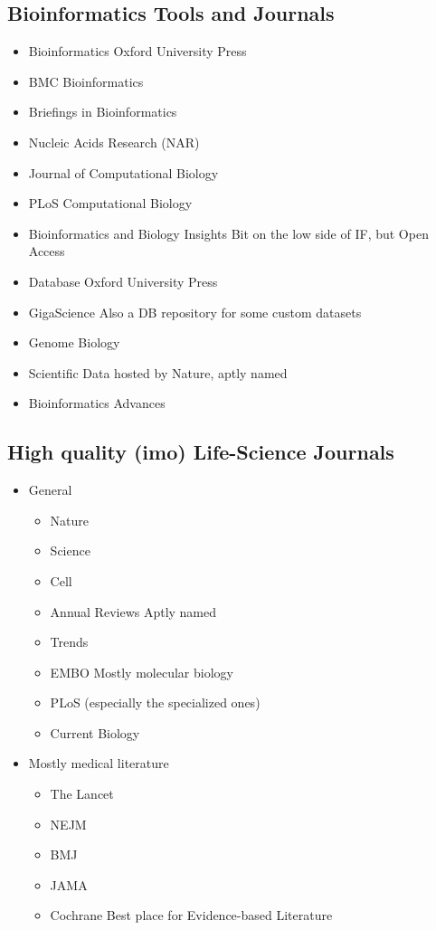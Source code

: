 \documentclass[11pt]{report}
\begin{document}
{\subsection{Bioinformatics Tools and Journals}
\begin{itemize}
	\item Bioinformatics \dotfill Oxford University Press
	\item BMC Bioinformatics
	\item Briefings in Bioinformatics
	\item Nucleic Acids Research (NAR)
	\item Journal of Computational Biology
	\item PLoS Computational Biology
	\item Bioinformatics and Biology Insights \dotfill Bit on the low side of IF, but Open Access
	\item Database \dotfill Oxford University Press
	\item GigaScience \dotfill Also a DB repository for some custom datasets
	\item Genome Biology
	\item Scientific Data \dotfill hosted by Nature, aptly named
	\item Bioinformatics Advances
\end{itemize}
\subsection{High quality (imo) Life-Science Journals}
\begin{itemize}
	\item General
	\begin{itemize}
		\item Nature
		\item Science
		\item Cell
		\item Annual Reviews \dotfill Aptly named
		\item Trends
		\item EMBO \dotfill Mostly molecular biology
		\item PLoS (especially the specialized ones)
		\item Current Biology
	\end{itemize}
	\item Mostly medical literature
	\begin{itemize}
		\item The Lancet
		\item NEJM
		\item BMJ
		\item JAMA
		\item Cochrane \dotfill Best place for Evidence-based Literature
	\end{itemize}

\end{itemize}}
\end{document}

